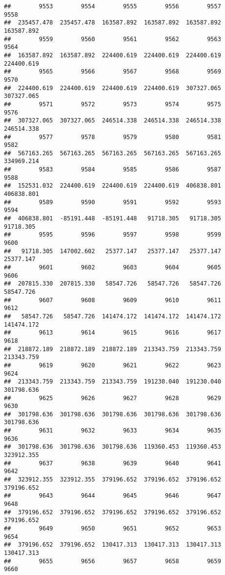 \documentclass[
]{book}
\begin{document}
\begin{verbatim}
##        9553        9554        9555        9556        9557        9558 
##  235457.478  235457.478  163587.892  163587.892  163587.892  163587.892 
##        9559        9560        9561        9562        9563        9564 
##  163587.892  163587.892  224400.619  224400.619  224400.619  224400.619 
##        9565        9566        9567        9568        9569        9570 
##  224400.619  224400.619  224400.619  224400.619  307327.065  307327.065 
##        9571        9572        9573        9574        9575        9576 
##  307327.065  307327.065  246514.338  246514.338  246514.338  246514.338 
##        9577        9578        9579        9580        9581        9582 
##  567163.265  567163.265  567163.265  567163.265  567163.265  334969.214 
##        9583        9584        9585        9586        9587        9588 
##  152531.032  224400.619  224400.619  224400.619  406838.801  406838.801 
##        9589        9590        9591        9592        9593        9594 
##  406838.801  -85191.448  -85191.448   91718.305   91718.305   91718.305 
##        9595        9596        9597        9598        9599        9600 
##   91718.305  147002.602   25377.147   25377.147   25377.147   25377.147 
##        9601        9602        9603        9604        9605        9606 
##  207815.330  207815.330   58547.726   58547.726   58547.726   58547.726 
##        9607        9608        9609        9610        9611        9612 
##   58547.726   58547.726  141474.172  141474.172  141474.172  141474.172 
##        9613        9614        9615        9616        9617        9618 
##  218872.189  218872.189  218872.189  213343.759  213343.759  213343.759 
##        9619        9620        9621        9622        9623        9624 
##  213343.759  213343.759  213343.759  191230.040  191230.040  301798.636 
##        9625        9626        9627        9628        9629        9630 
##  301798.636  301798.636  301798.636  301798.636  301798.636  301798.636 
##        9631        9632        9633        9634        9635        9636 
##  301798.636  301798.636  301798.636  119360.453  119360.453  323912.355 
##        9637        9638        9639        9640        9641        9642 
##  323912.355  323912.355  379196.652  379196.652  379196.652  379196.652 
##        9643        9644        9645        9646        9647        9648 
##  379196.652  379196.652  379196.652  379196.652  379196.652  379196.652 
##        9649        9650        9651        9652        9653        9654 
##  379196.652  379196.652  130417.313  130417.313  130417.313  130417.313 
##        9655        9656        9657        9658        9659        9660 

\end{verbatim}
\end{document}

